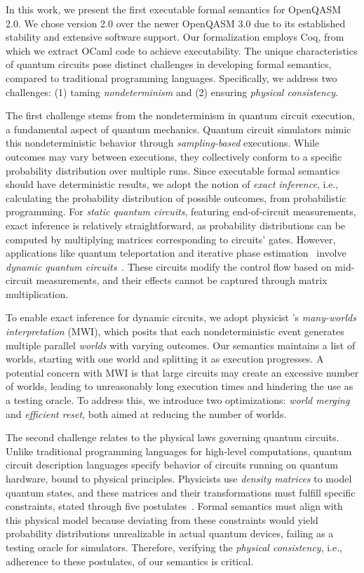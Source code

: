 In this work, we present the first executable formal semantics for OpenQASM
2.0.
%
We chose version 2.0 over the newer OpenQASM 3.0 due to its established
stability and extensive software support.
%
Our formalization employs Coq, from which we extract OCaml code to achieve
executability.
%
The unique characteristics of quantum circuits pose distinct challenges in
developing formal semantics, compared to traditional programming languages.
%
Specifically, we address two challenges:
%
(1) taming \emph{nondeterminism} and (2) ensuring \emph{physical consistency}.

The first challenge stems from the nondeterminism in quantum circuit execution,
a fundamental aspect of quantum mechanics.
%
Quantum circuit simulators mimic this nondeterministic behavior through
\emph{sampling-based} executions.
%
While outcomes may vary between executions, they collectively conform to a
specific probability distribution over multiple runs.
%
Since executable formal semantics should have deterministic results, we adopt
the notion of \emph{exact inference}, i.e., calculating the probability
distribution of possible outcomes, from probabilistic programming.
%
For \emph{static quantum circuits}, featuring end-of-circuit measurements,
exact inference is relatively straightforward, as probability distributions can
be computed by multiplying matrices corresponding to circuits' gates.
%
However, applications like quantum teleportation and iterative phase
estimation~\cite{dobsicek2007arbitrary} involve \emph{dynamic quantum
	circuits}~\cite{dynamic-circuit}.
%
These circuits modify the control flow based on mid-circuit measurements, and
their effects cannot be captured through matrix multiplication.

To enable exact inference for dynamic circuits, we adopt physicist
\citet{everett1957relative}'s \emph{many-worlds interpretation} (MWI), which
posits that each nondeterministic event generates multiple parallel
\emph{worlds} with varying outcomes.
%
Our semantics maintains a list of worlds, starting with one world and splitting
it as execution progresses.
%
A potential concern with MWI is that large circuits may create an excessive
number of worlds, leading to unreasonably long execution times and hindering
the use as a testing oracle.
%
To address this, we introduce two optimizations:
%
\emph{world merging} and \emph{efficient reset}, both aimed at reducing the
number of worlds.

The second challenge relates to the physical laws governing quantum circuits.
%
Unlike traditional programming languages for high-level computations, quantum
circuit description languages specify behavior of circuits running on quantum
hardware, bound to physical principles.
%
Physicists use \emph{density matrices} to model quantum states, and these
matrices and their transformations must fulfill specific constraints, stated
through five postulates~\cite{scherer2019mathematics}.
%
Formal semantics must align with this physical model because deviating from
these constraints would yield probability distributions unrealizable in actual
quantum devices, failing as a testing oracle for simulators.
%
Therefore, verifying the \emph{physical consistency}, i.e., adherence to these
postulates, of our semantics is critical.

